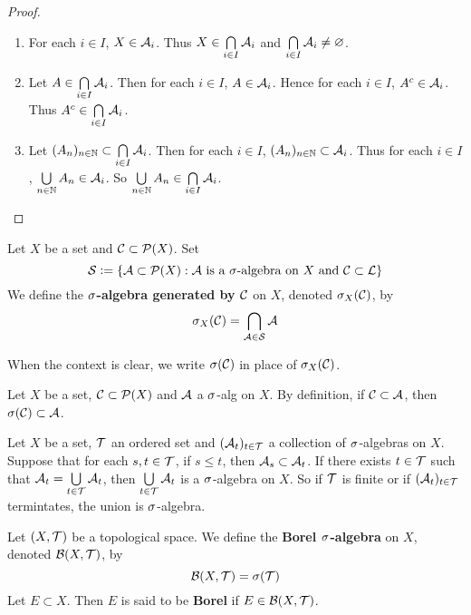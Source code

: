 \documentclass{book}
\begin{document}
	\begin{proof}\
		\begin{enumerate}
			\item For each $i \in I$, $X \in \mathcal{A}_i$. Thus $X \in \bigcap\limits_{i \in I}\mathcal{A}_i$ and $\bigcap\limits_{i \in I}\mathcal{A}_i \neq \varnothing$.
			\item Let $A \in \bigcap\limits_{i \in I}\mathcal{A}_i$. Then for each $i \in I$, $A \in \mathcal{A}_i$. Hence for each $i \in I$, $A^c \in \mathcal{A}_i$. Thus $A^c \in \bigcap\limits_{i \in I}\mathcal{A}_i$. 
			\item Let $(A_n)_{n \in \mathbb{N}} \subset \bigcap\limits_{i \in I}\mathcal{A}_i$. Then for each $i \in I$, $(A_n)_{n \in \mathbb{N}} \subset \mathcal{A}_i$. Thus for each $i \in I$, $\bigcup\limits_{n \in \mathbb{N}}A_n \in \mathcal{A}_i$. So $\bigcup\limits_{n \in \mathbb{N}}A_n \in \bigcap\limits_{i \in I}\mathcal{A}_i$.
		\end{enumerate}
	\end{proof}
	
	\begin{defn}  
		Let $X$ be a set and $\mathcal{C} \subset \mathcal{P}(X)$. Set 
		$$\mathcal{S} \vcentcolon= \{\mathcal{A} \subset \mathcal{P}(X): \mathcal{A} \text{ is a }\sigma\text{-algebra on }X \text{ and } \mathcal{C} \subset \mathcal{L}\}$$ 
		We define the \textbf{$\sigma$-algebra generated by $\mathcal{C}$} on $X$, denoted $\sigma_X(\mathcal{C})$, by $$\sigma_X(\mathcal{C}) = \bigcap_{\mathcal{A} \in \mathcal{S}} \mathcal{A} $$
	\end{defn}

	\begin{note}
		When the context is clear, we write $\sigma(\mathcal{C})$ in place of $\sigma_X(\mathcal{C})$.
	\end{note}
	
	\begin{note}
		Let $X$ be a set, $\mathcal{C} \subset \mathcal{P}(X)$ and $\mathcal{A}$ a $\sigma$-alg on $X$. By definition, if $\mathcal{C} \subset \mathcal{A}$, then $\sigma(\mathcal{C}) \subset \mathcal{A}$.
	\end{note}
	
	\begin{note}
		Let $X$ be a set, $\mathcal{T}$ an ordered set and $(\mathcal{A}_t)_{t\in \mathcal{T}}$ a collection of $\sigma$-algebras on $X$. Suppose that for each $s,t \in \mathcal{T}$, if $s \leq t$, then $\mathcal{A}_s \subset \mathcal{A}_t$. If there exists $t \in \mathcal{T}$ such that $\mathcal{A}_t = \bigcup\limits_{t \in \mathcal{T}}\mathcal{A}_t$, then $\bigcup\limits_{t \in \mathcal{T}}\mathcal{A}_t$ is a $\sigma$-algebra on $X$. So if $\mathcal{T}$ is finite or if $(\mathcal{A}_t)_{t \in \mathcal{T}}$ termintates, the union is $\sigma$-algebra.
	\end{note}
	
	\begin{defn}  
		Let $(X,\mathcal{T})$ be a topological space. We define the \textbf{Borel $\sigma$-algebra} on $X$, denoted $\mathcal{B}(X, \mathcal{T})$, by 
		$$\mathcal{B}(X, \mathcal{T}) = \sigma(\mathcal{T})$$  
		Let $E \subset X$. Then $E$ is said to be \textbf{Borel} if $E \in \mathcal{B}(X, \mathcal{T})$.
	\end{defn}
\end{document}
